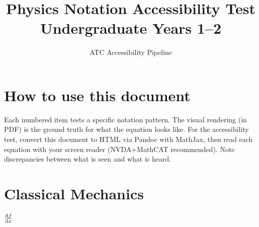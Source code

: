 \documentclass[11pt]{article}
\title{Physics Notation Accessibility Test \\
       \large Undergraduate Years 1--2}
\author{ATC Accessibility Pipeline}
\date{}
\begin{document}
\maketitle

\section*{How to use this document}

Each numbered item tests a specific notation pattern. The visual
rendering (in PDF) is the ground truth for what the equation looks like.
For the accessibility test, convert this document to HTML via Pandoc with
MathJax, then read each equation with your screen reader (NVDA+MathCAT
recommended). Note discrepancies between what is seen and what is heard.

\section{Classical Mechanics}

$\dv{f}{x}$
\end{document}
